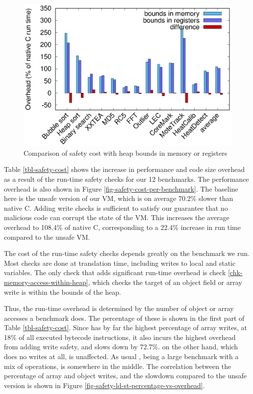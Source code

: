 \begin{figure}
\centering
\includegraphics[width=\mygraphsize]{safety-cost-diff-using-regs.eps}
\caption{Comparison of safety cost with heap bounds in memory or registers}
\label{fig-safety-cost-memory-or-registers}
\end{figure}

Table \ref{tbl-safety-cost} shows the increase in performance and code size overhead as a result of the run-time safety checks for our 12 benchmarks. The performance overhead is also shown in Figure \ref{fig-safety-cost-per-benchmark}. The baseline here is the unsafe version of our VM, which is on average 70.2\% slower than native C. Adding write checks is sufficient to satisfy our guarantee that no malicious code can corrupt the state of the VM. This increases the average overhead to 108.4\% of native C, corresponding to a 22.4\% increase in run time compared to the unsafe VM.

The cost of the run-time safety checks depends greatly on the benchmark we run. Most checks are done at translation time, including writes to local and static variables. The only check that adds significant run-time overhead is check \ref{chk-memory-access-within-heap}, which checks the target of an object field or array write is within the bounds of the heap.

Thus, the run-time overhead is determined by the number of object or array accesses a benchmark does. The percentage of these is shown in the first part of Table \ref{tbl-safety-cost}. Since  has by far the highest percentage of array writes, at 18\% of all executed bytecode instructions, it also incurs the highest overhead from adding write safety, and slows down by 72.7\%.  on the other hand, which does no writes at all, is unaffected. As usual , being a large benchmark with a mix of operations, is somewhere in the middle. The correlation between the percentage of array and object writes, and the slowdown compared to the unsafe version is shown in Figure \ref{fig-safety-ld-st-percentage-vs-overhead}.

